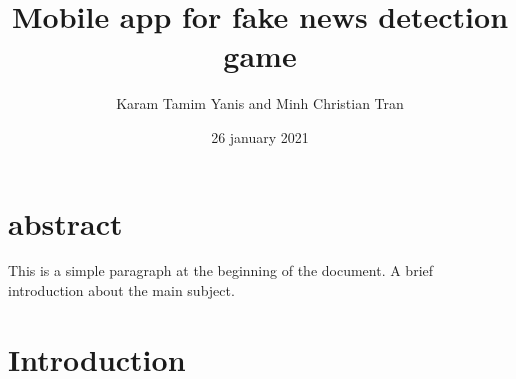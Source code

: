 \documentclass[12pt, letterpaper, twoside]{article}
\title{Mobile app for fake news detection game}
\author{Karam Tamim Yanis and Minh Christian Tran}
\date{26 january 2021}
\begin{document}
\begin{titlepage}
\maketitle
\thispagestyle{empty}%
\end{titlepage}

\section*{abstract}
This is a simple paragraph at the beginning of the 
document. A brief introduction about the main subject.
\cleardoublepage


\tableofcontents
\thispagestyle{empty}%
\cleardoublepage%

\setcounter{page}{1}%

\section{Introduction}
\end{document}
